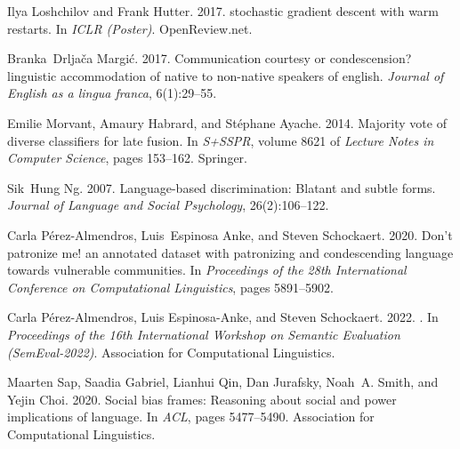 \documentclass[11pt]{article}
\begin{document}
\begin{thebibliography}{31}
    Ilya Loshchilov and Frank Hutter. 2017.
     stochastic gradient descent with warm restarts.
    \newblock In \emph{{ICLR} (Poster)}. OpenReview.net.
    
    Branka~Drlja{\v{c}}a Margi{\'c}. 2017.
    \newblock Communication courtesy or condescension? linguistic accommodation of
      native to non-native speakers of english.
    \newblock \emph{Journal of English as a lingua franca}, 6(1):29--55.
    
    Emilie Morvant, Amaury Habrard, and St{\'{e}}phane Ayache. 2014.
    \newblock Majority vote of diverse classifiers for late fusion.
    \newblock In \emph{{S+SSPR}}, volume 8621 of \emph{Lecture Notes in Computer
      Science}, pages 153--162. Springer.
    
    Sik~Hung Ng. 2007.
    \newblock Language-based discrimination: Blatant and subtle forms.
    \newblock \emph{Journal of Language and Social Psychology}, 26(2):106--122.
    
    Carla P{\'e}rez-Almendros, Luis~Espinosa Anke, and Steven Schockaert. 2020.
    \newblock Don’t patronize me! an annotated dataset with patronizing and
      condescending language towards vulnerable communities.
    \newblock In \emph{Proceedings of the 28th International Conference on
      Computational Linguistics}, pages 5891--5902.
    
    Carla P{\'e}rez-Almendros, Luis Espinosa-Anke, and Steven Schockaert. 2022.
    .
    \newblock In \emph{Proceedings of the 16th International Workshop on Semantic
      Evaluation (SemEval-2022)}. Association for Computational Linguistics.
    
    Maarten Sap, Saadia Gabriel, Lianhui Qin, Dan Jurafsky, Noah~A. Smith, and
      Yejin Choi. 2020.
    \newblock Social bias frames: Reasoning about social and power implications of
      language.
    \newblock In \emph{{ACL}}, pages 5477--5490. Association for Computational
      Linguistics.
    

\end{thebibliography}
\end{document}
